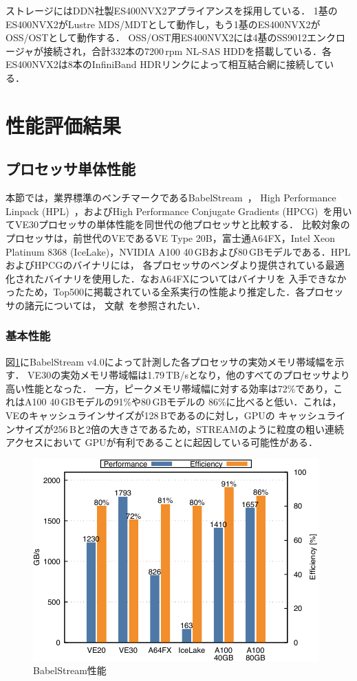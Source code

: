 ﻿\documentclass[submit,techrep,noauthor]{ipsj}
\begin{document}
ストレージにはDDN社製ES400NVX2アプライアンスを採用している．
1基のES400NVX2がLustre MDS/MDTとして動作し，もう1基のES400NVX2がOSS/OSTとして動作する．
OSS/OST用ES400NVX2には4基のSS9012エンクロージャが接続され，合計332本の7200\,rpm NL-SAS
HDDを搭載している．各ES400NVX2は8本のInfiniBand HDRリンクによって相互結合網に接続している．

\section{性能評価結果}

\subsection{プロセッサ単体性能}

本節では，業界標準のベンチマークであるBabelStream~\cite{Deakin2018}，
High Performance Linpack (HPL)~\cite{Dongarra2003}，およびHigh Performance Conjugate
Gradients (HPCG)~\cite{Dongarra2016}を用いてVE30プロセッサの単体性能を同世代の他プロセッサと比較する．
比較対象のプロセッサは，前世代のVEであるVE Type 20B，富士通A64FX，Intel Xeon Platinum 8368
(IceLake)，NVIDIA A100 40\,GBおよび80\,GBモデルである．HPLおよびHPCGのバイナリには，
各プロセッサのベンダより提供されている最適化されたバイナリを使用した．なおA64FXについてはバイナリを
入手できなかったため，Top500に掲載されている全系実行の性能より推定した．各プロセッサの諸元については，
文献~\cite{Takahashi2023}を参照されたい．

\subsubsection{基本性能}

図\ref{fig:stream}にBabelStream v4.0によって計測した各プロセッサの実効メモリ帯域幅を示す．
VE30の実効メモリ帯域幅は1.79\,TB/sとなり，他のすべてのプロセッサより高い性能となった．
一方，ピークメモリ帯域幅に対する効率は72\%であり，これはA100 40\,GBモデルの91\%や80\,GBモデルの
86\%に比べると低い．これは，VEのキャッシュラインサイズが128\,Bであるのに対し，GPUの
キャッシュラインサイズが256\,Bと2倍の大きさであるため，STREAMのように粒度の粗い連続アクセスにおいて
GPUが有利であることに起因している可能性がある．

\begin{figure}
  \centering
  \includegraphics{figs/stream.pdf}
  \caption{BabelStream性能~\cite{Takahashi2023}}\label{fig:stream}
\end{figure}
\end{document}
